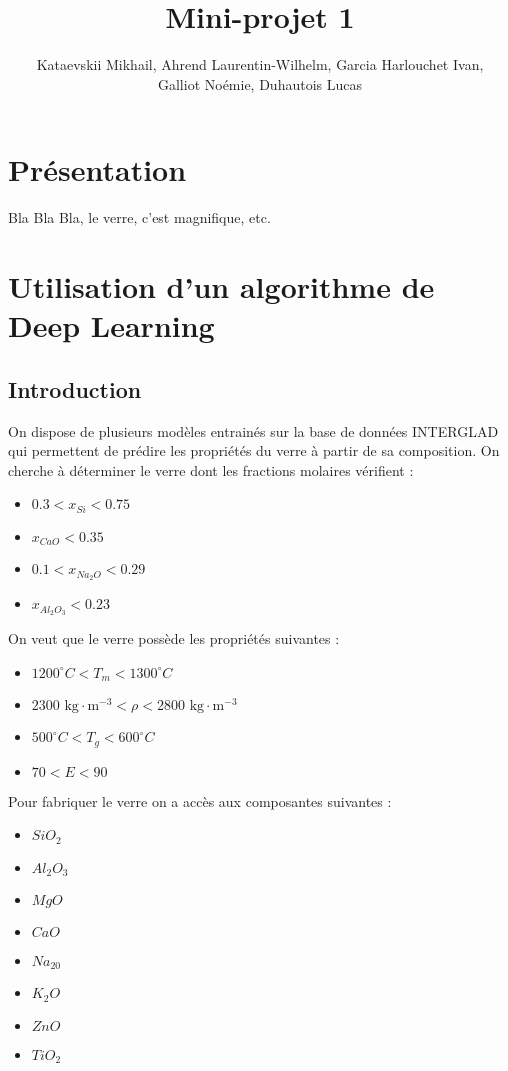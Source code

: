 \documentclass{article}
\title{Mini-projet 1}
\author{Kataevskii Mikhail, Ahrend Laurentin-Wilhelm, Garcia Harlouchet Ivan, \\ Galliot Noémie, Duhautois Lucas}
\begin{document}
\maketitle

\section{Présentation}

Bla Bla Bla, le verre, c'est magnifique, etc.

\section{Utilisation d'un algorithme de Deep Learning}
\subsection{Introduction}

On dispose de plusieurs modèles entrainés sur la base de données INTERGLAD qui permettent de prédire les propriétés du verre à partir de sa composition. On cherche à déterminer le verre dont les fractions molaires vérifient :
\begin{itemize}
    \item $0.3 < x_{Si} < 0.75$
    \item $x_{CaO} < 0.35$
    \item $0.1 < x_{Na_2O} < 0.29$
    \item $x_{Al_2O_3} < 0.23$
\end{itemize} 

On veut que le verre possède les propriétés suivantes :
\begin{itemize}
    \item $1200 ^{\circ} C < T_m < 1300 ^{\circ} C$
    \item $2300 \text{ kg} \cdot \text{m}^{-3} < \rho < 2800 \text{ kg} \cdot \text{m}^{-3}$
    \item $500 ^{\circ} C < T_g < 600 ^{\circ} C$
    \item $70 < E < 90$
\end{itemize}

Pour fabriquer le verre on a accès aux composantes suivantes :
\begin{itemize}
    \item $SiO_2$
    \item $Al_2O_3$
    \item $MgO$
    \item $CaO$
    \item $Na_20$
    \item $K_2O$
    \item $ZnO$
    \item $TiO_2$
\end{itemize}
\end{document}
